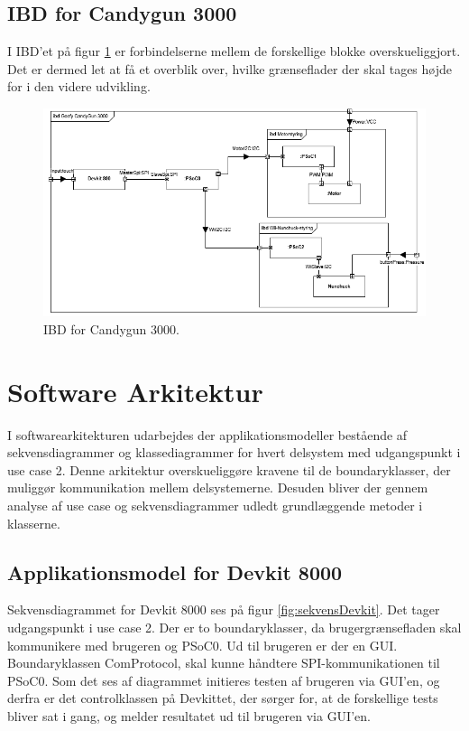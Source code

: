\subsection{IBD for Candygun 3000}
I IBD'et på figur \ref{fig:IBD} er forbindelserne mellem de forskellige blokke overskueliggjort. Det er dermed let at få et overblik over, hvilke grænseflader der skal tages højde for i den videre udvikling. 

\begin{figure}[H]
	\centering
	\includegraphics[width=\textwidth]{Systemarkitektur/images/GoofycandygunIBD.png}
	\caption{IBD for Candygun 3000.}
	\label{fig:IBD}
\end{figure}

\section{Software Arkitektur}
I softwarearkitekturen udarbejdes der applikationsmodeller bestående af sekvensdiagrammer og klassediagrammer for hvert delsystem med udgangspunkt i use case 2. Denne arkitektur overskueliggøre kravene til de boundaryklasser, der muliggør kommunikation mellem delsystemerne. Desuden bliver der gennem analyse af use case og sekvensdiagrammer udledt grundlæggende metoder i klasserne.  

\subsection{Applikationsmodel for Devkit 8000}
Sekvensdiagrammet for Devkit 8000 ses på figur \ref{fig:sekvensDevkit}. Det tager udgangspunkt i use case 2. Der er to boundaryklasser, da brugergrænsefladen skal kommunikere med brugeren og PSoC0. Ud til brugeren er der en GUI. Boundaryklassen ComProtocol, skal kunne håndtere SPI-kommunikationen til PSoC0. Som det ses af diagrammet initieres testen af brugeren via GUI'en, og derfra er det controlklassen på Devkittet, der sørger for, at de forskellige tests bliver sat i gang, og melder resultatet ud til brugeren via GUI'en.

